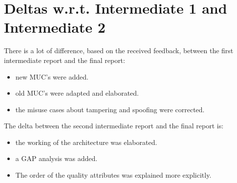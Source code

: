 \documentclass[a4paper,11pt]{report}
\begin{document}
\chapter{Deltas w.r.t. Intermediate 1 and Intermediate 2}
There is a lot of difference, based on the received feedback, between the first intermediate report and the final report:
\begin{itemize}
\item new MUC's were added.
\item old MUC's were adapted and elaborated.
\item the misuse cases about tampering and spoofing were corrected.
\end{itemize}

The delta between the second intermediate report and the final report is:
\begin{itemize}
\item the working of the architecture was elaborated.
\item a GAP analysis was added.
\item The order of the quality attributes was explained more explicitly.
\end{itemize}


\nocite{1202957}
\nocite{citeulike:174301}
\nocite{yskout}
\nocite{Avgeriou2005}
\nocite{citeulike:171548}


\end{document}
